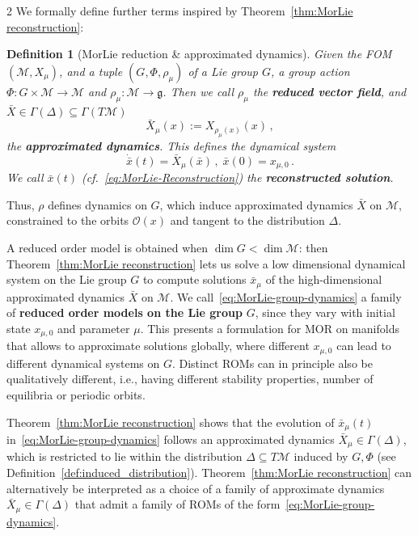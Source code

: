 \documentclass{article}
\newtheorem{definition}[theorem]{Definition}
\newcommand{\M}{\mathcal{M}}                                %
\newcommand{\g}{\mathfrak{g}}                               %
\newcommand{\appX}{\bar{X}}
\newcommand{\state}{x}
\newcommand{\appstate}{\bar{x}}
\begin{document}
\begin{multicols}{2}
We formally define further terms inspired by Theorem~\ref{thm:MorLie reconstruction}:
\begin{definition}[MorLie reduction \& approximated dynamics]\label{def:AFOM}
    Given the FOM $(\M,X_\mu)$, and a tuple $(G,\Phi,\rho_\mu)$ of a Lie group $G$, a group action $\Phi:G\times \M \rightarrow \M$ and $\rho_\mu:\M\rightarrow \g$. Then we call $\rho_\mu$ the \textbf{reduced vector field}, and $\appX \in \Gamma(\Delta) \subseteq \Gamma(T\M)$ 
    \begin{equation}
        \appX_\mu(\state):= X_{\rho_\mu(\state)}(\state) \,,
    \end{equation}
    the \textbf{approximated dynamics}. This defines the dynamical system %
    \begin{equation}\label{eq:AFOM}
        \dot{\appstate}(t) = \appX_\mu(\appstate)\,,\; \appstate(0) = \state_{\mu,0} \,.
    \end{equation}
    We call $\appstate(t)$ (cf.~\eqref{eq:MorLie-Reconstruction}) the \textbf{reconstructed solution}.
\end{definition}
Thus, $\rho$ defines dynamics on $G$, which induce approximated dynamics $\appX$ on $\M$, constrained to the orbits $\mathcal{O}(\state)$ and tangent to the distribution $\Delta$.

A reduced order model is obtained when $\dim G < \dim \M$: then Theorem~\eqref{thm:MorLie reconstruction} lets us solve a low dimensional dynamical system on the Lie group $G$ to compute solutions $\appstate_\mu$ of the high-dimensional approximated dynamics $\appX$ on $\M$. We call~\eqref{eq:MorLie-group-dynamics} a family of \textbf{reduced order models on the Lie group} $G$, since they vary with initial state $\state_{\mu,0}$ and parameter $\mu$. This presents a formulation for MOR on manifolds that allows to approximate solutions globally, where different $\state_{\mu,0}$ can lead to different dynamical systems on $G$. Distinct ROMs can in principle also be qualitatively different, i.e., having different stability properties, number of equilibria or periodic orbits. 

Theorem~\ref{thm:MorLie reconstruction} shows that the evolution of $\appstate_\mu(t)$ in~\eqref{eq:MorLie-group-dynamics} follows an approximated dynamics $\appX_\mu \in \Gamma(\Delta)$, which is restricted to lie within the distribution $\Delta \subseteq T\M$ induced by $G,\Phi$ (see Definition~\ref{def:induced_distribution}). Theorem~\ref{thm:MorLie reconstruction} can alternatively be interpreted as a choice of a family of approximate dynamics $\appX_\mu \in \Gamma(\Delta)$ that admit a family of ROMs of the form~\eqref{eq:MorLie-group-dynamics}.


\end{multicols}
\end{document}
